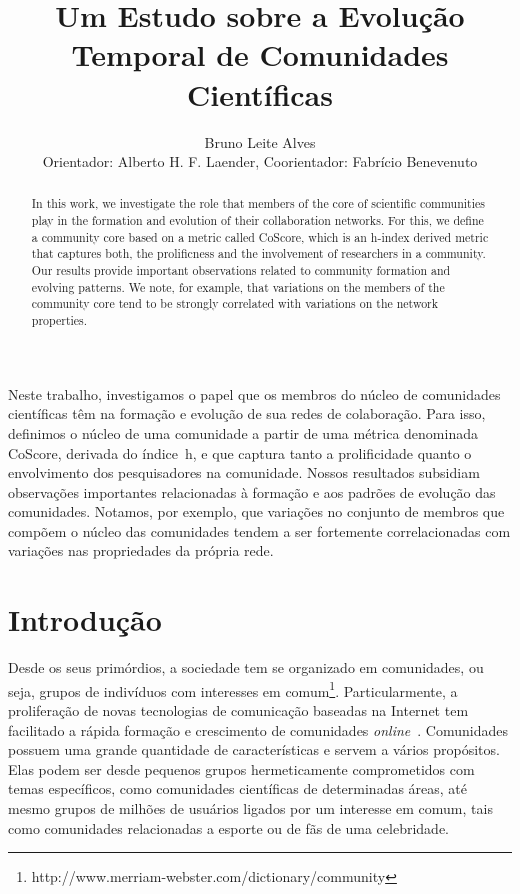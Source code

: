 \documentclass[12pt]{article}
\title{Um Estudo sobre a Evolução Temporal de Comunidades Científicas}
\author{Bruno Leite Alves\inst{1} \\ Orientador: Alberto H. F. Laender\inst{1},  
	  Coorientador: Fabrício Benevenuto\inst{1} }
\begin{document}
 

\maketitle

\begin{abstract}
In this work, we investigate the role that members of the core of scientific 
communities play in the formation and evolution of their collaboration 
networks. For this, we define a community core based on a metric 
called CoScore, which is an h-index derived metric that captures both, 
the prolificness and the involvement of researchers 
in a community. Our results provide important observations related to community 
formation and evolving patterns. We note, for example, 
that variations on the members of the community core tend to be 
strongly correlated with variations on the network properties.
\end{abstract} 

\begin{resumo} 
Neste trabalho, investigamos o papel que os membros do núcleo de
comunidades científicas têm na formação e evolução de sua redes de
colaboração. Para isso, definimos o núcleo de uma comunidade a partir de
uma métrica denominada CoScore, derivada do índice~h, e que captura tanto
a prolificidade quanto o envolvimento dos pesquisadores na comunidade.
Nossos resultados subsidiam observações importantes relacionadas à
formação e aos padrões de evolução das comunidades. Notamos, por exemplo,
que variações no conjunto de membros que compõem o núcleo das comunidades
tendem a ser fortemente correlacionadas com variações nas propriedades da
própria rede.
\end{resumo}


\section{Introdução}

Desde os seus primórdios, a sociedade tem se organizado em comunidades, ou seja, grupos de indivíduos 
com interesses em comum\footnote{http://www.merriam-webster.com/dictionary/community}. Particularmente, 
a proliferação de novas tecnologias de comunicação baseadas na Internet tem facilitado a rápida 
formação e crescimento de comunidades \textit{online}~\cite{Kleinberg2008}. Comunidades possuem uma grande 
quantidade de características e servem a vários propósitos. Elas podem ser desde pequenos 
grupos hermeticamente comprometidos com temas específicos, como comunidades científicas de determinadas áreas, 
até mesmo grupos de milhões de usuários ligados por um interesse em comum, tais como comunidades 
relacionadas a esporte ou de fãs de uma celebridade.
\end{document}
